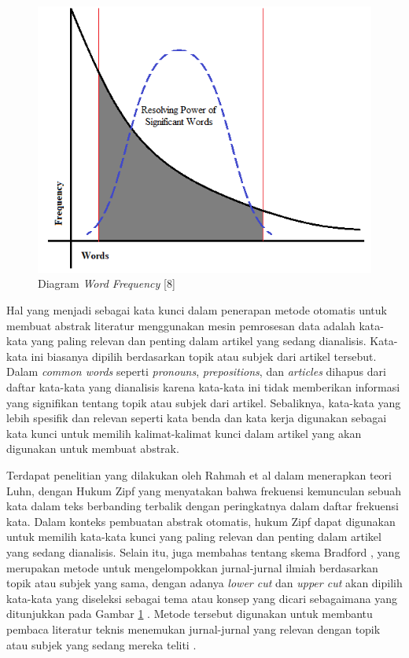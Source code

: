 \begin{figure}[H]
    \centering
    \includegraphics[width=0.6\linewidth]{img/bab2-5.png}
    \caption{Diagram \textit{Word Frequency} [8]}
    \label{fig:2-5}
\end{figure}

Hal yang menjadi sebagai kata kunci dalam penerapan metode otomatis untuk membuat abstrak literatur menggunakan mesin pemrosesan data adalah kata-kata yang paling relevan dan penting dalam artikel yang sedang dianalisis. Kata-kata ini biasanya dipilih berdasarkan topik atau subjek dari artikel tersebut. Dalam \textit{common words} seperti \textit{pronouns}, \textit{prepositions}, dan \textit{articles} dihapus dari daftar kata-kata yang dianalisis karena kata-kata ini tidak memberikan informasi yang signifikan tentang topik atau subjek dari artikel. Sebaliknya, kata-kata yang lebih spesifik dan relevan seperti kata benda dan kata kerja digunakan sebagai kata kunci untuk memilih kalimat-kalimat kunci dalam artikel yang akan digunakan untuk membuat abstrak.

Terdapat penelitian yang dilakukan oleh Rahmah et al \cite{rahmah_critical_2022} dalam menerapkan teori Luhn, dengan Hukum Zipf yang menyatakan bahwa frekuensi kemunculan sebuah kata dalam teks berbanding terbalik dengan peringkatnya dalam daftar frekuensi kata. Dalam konteks pembuatan abstrak otomatis, hukum Zipf dapat digunakan untuk memilih kata-kata kunci yang paling relevan dan penting dalam artikel yang sedang dianalisis. Selain itu, juga membahas tentang skema Bradford \cite{luhn_automatic_1958}, yang merupakan metode untuk mengelompokkan jurnal-jurnal ilmiah berdasarkan topik atau subjek yang sama, dengan adanya \textit{lower cut} dan \textit{upper cut} akan dipilih kata-kata yang diseleksi sebagai tema atau konsep yang dicari sebagaimana yang ditunjukkan pada Gambar \ref{fig:2-5} \cite{luhn_automatic_1958}. Metode tersebut digunakan untuk membantu pembaca literatur teknis menemukan jurnal-jurnal yang relevan dengan topik atau subjek yang sedang mereka teliti \cite{rahmah_critical_2022}.